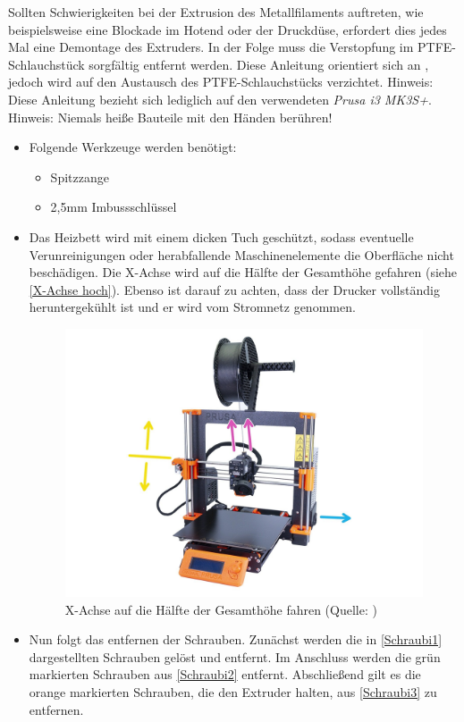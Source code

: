Sollten Schwierigkeiten bei der Extrusion des Metallfilaments auftreten, wie beispielsweise eine Blockade im Hotend oder der Druckdüse, erfordert dies jedes Mal eine Demontage des Extruders. In der Folge muss die Verstopfung im PTFE-Schlauchstück sorgfältig entfernt werden. Diese Anleitung orientiert sich an \Autocite{Prusa}, jedoch wird auf den Austausch des PTFE-Schlauchstücks verzichtet.
Hinweis: Diese Anleitung bezieht sich lediglich auf den verwendeten \textit{Prusa i3 MK3S+}.\\
Hinweis: Niemals heiße Bauteile mit den Händen berühren!
\begin{itemize}
  \item Folgende Werkzeuge werden benötigt:
    \begin{itemize}
      \item Spitzzange
      \item 2,5mm Imbussschlüssel
    \end{itemize}
    \item Das Heizbett wird mit einem dicken Tuch geschützt, sodass eventuelle Verunreinigungen oder herabfallende Maschinenelemente die Oberfläche nicht beschädigen. Die X-Achse wird auf die Hälfte der Gesamthöhe gefahren (siehe \autoref{X-Achse hoch}). Ebenso ist darauf zu achten, dass der Drucker vollständig heruntergekühlt ist und er wird vom Stromnetz genommen.
      \begin{figure}[h]
        \centering
        \includegraphics[width=0.5\linewidth]{bilder/Anleitung - X-Achse hoch.jpg}
              \caption[Anleitung: X-Achse auf die Hälfte der Gesamthöhe fahren] { X-Achse auf die Hälfte der Gesamthöhe fahren (Quelle: \autocite{Prusa})}
        \label{X-Achse hoch}
      \end{figure}
    \item Nun folgt das entfernen der Schrauben. Zunächst werden die in \autoref{Schraubi1} dargestellten Schrauben gelöst und entfernt. Im Anschluss werden die grün markierten Schrauben aus \autoref{Schraubi2} entfernt. Abschließend gilt es die orange markierten Schrauben, die den Extruder halten, aus \autoref{Schraubi3} zu entfernen.

\end{itemize}
